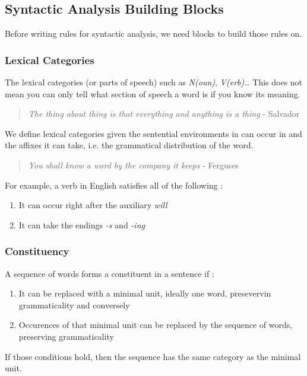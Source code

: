\documentclass{cours}
\begin{document}
\subsection{Syntactic Analysis Building Blocks}
Before writing rules for syntactic analysis, we need blocks to build those rules on.

\subsubsection{Lexical Categories}
The lexical categories (or parts of speech) such as \textsl{N(oun)}, \textsl{V(erb)}\dots
This does not mean you can only tell what section of speech a word is if you know its meaning.\\
\begin{quotation}
    \textit{The thing about thing is that everything and anything is a thing} - Salvador
\end{quotation}

\begin{definition}
    We define lexical categories given the sentential environments in can occur in and the affixes it can take, i.e. the grammatical distribution of the word.
\end{definition}
\begin{quotation}
    \textit{You shall know a word by the company it keeps} - Ferguses
\end{quotation}
For example, a verb in English satisfies all of the following\! :
\begin{enumerate}
    \item It can occur right after the auxiliary \textsl{will}
    \item It can take the endings \textsl{-s} and \textsl{-ing}
\end{enumerate}

\subsubsection{Constituency}
\begin{definition}[A Heuristic]
    A sequence of words forms a constituent in a sentence if\! :
    \begin{enumerate}
        \item It can be replaced with a minimal unit, ideally one word, presevervin grammaticality and conversely
        \item Occurences of that minimal unit can be replaced by the sequence of words, preserving grammaticality
    \end{enumerate}
    If those conditions hold, then the sequence has the same category as the minimal unit.
\end{definition}
\end{document}
